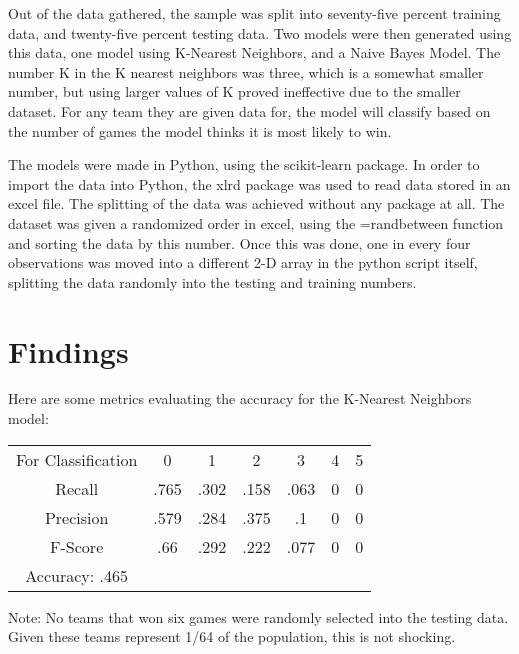 \documentclass{article}
\begin{document}
Out of the data gathered, the sample was split into seventy-five percent training data, and twenty-five percent testing data. Two models were then generated using this data, one model using K-Nearest Neighbors, and a Naive Bayes Model. The number K in the K nearest neighbors was three, which is a somewhat smaller number, but using larger values of K proved ineffective due to the smaller dataset. For any team they are given data for, the model will classify based on the number of games the model thinks it is most likely to win. 

The models were made in Python, using the scikit-learn package. In order to import the data into Python, the xlrd package was used to read data stored in an excel file. The splitting of the data was achieved without any package at all. The dataset was given a randomized order in excel, using the =randbetween function and sorting the data by this number. Once this was done, one in every four observations was moved into a different 2-D array in the python script itself, splitting the data randomly into the testing and training numbers. 

\section{Findings}
Here are some metrics evaluating the accuracy for the K-Nearest Neighbors model:

\begin{center}
\begin{tabular}{ c c c c c c c }
 For Classification & 0 & 1 & 2 & 3 & 4 & 5 \\
 Recall & .765 & .302 & .158 & .063 & 0 & 0 \\ 
 Precision & .579 & .284 & .375 & .1 & 0 & 0 \\  
 F-Score & .66 & .292 & .222 & .077 & 0 & 0  \\
 Accuracy: .465
\end{tabular}
\end{center}

Note: No teams that won six games were randomly selected into the testing data. Given these teams represent 1/64 of the population, this is not shocking.
\end{document}
